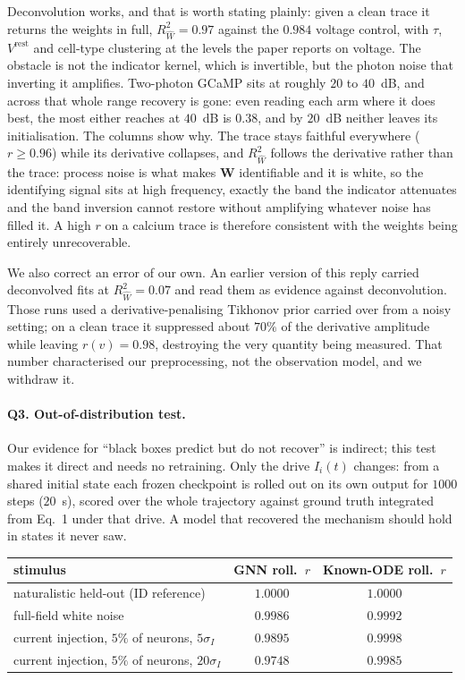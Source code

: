 \documentclass[11pt]{article}
\newcommand{\Rw}{R^2_{\widehat W}}
\newcommand{\Mat}[1]{\mathbf{#1}}
\begin{document}
Deconvolution works, and that is worth stating plainly: given a clean trace it
returns the weights in full, $\Rw = 0.97$ against the $0.984$ voltage control,
with $\tau$, $V^{\mathrm{rest}}$ and cell-type clustering at the levels the paper
reports on voltage. The obstacle is not the indicator kernel, which is
invertible, but the photon noise that inverting it amplifies. Two-photon GCaMP
sits at roughly $20$ to $40$~dB, and across that whole range recovery is gone:
even reading each arm where it does best, the most either reaches at
$40$~dB is $0.38$, and by $20$~dB neither leaves its initialisation. The
columns show why. The trace stays faithful everywhere ($r \geq 0.96$) while
its derivative collapses, and $\Rw$ follows the derivative rather than the trace:
process noise is what makes $\Mat{W}$ identifiable and it is white, so the
identifying signal sits at high frequency, exactly the band the indicator
attenuates and the band inversion cannot restore without amplifying whatever
noise has filled it. A high $r$ on a calcium trace is therefore consistent with
the weights being entirely unrecoverable.

We also correct an error of our own. An earlier version of this reply carried
deconvolved fits at $\Rw = 0.07$ and read them as evidence against
deconvolution. Those runs used a derivative-penalising Tikhonov prior carried
over from a noisy setting; on a clean trace it suppressed about $70\%$ of the
derivative amplitude while leaving $r(v) = 0.98$, destroying the very quantity
being measured. That number characterised our preprocessing, not the observation
model, and we withdraw it.

\paragraph{Q3. Out-of-distribution test.}
Our evidence for ``black boxes predict but do not recover'' is indirect; this
test makes it direct and needs no retraining. Only the drive $I_i(t)$ changes:
from a shared initial state each frozen checkpoint is rolled out on its own
output for $1000$ steps ($20$~s), scored over the whole trajectory against
ground truth integrated from Eq.~1 under that drive. A model that recovered the
mechanism should hold in states it never saw.
\label{link6}
\begin{center}
{\footnotesize
\begin{tabular}{lcc}
\toprule
stimulus & GNN roll.\ $r$ & Known-ODE roll.\ $r$ \\
\midrule
naturalistic held-out (ID reference) & $1.0000$ & $1.0000$ \\
full-field white noise               & $0.9986$ & $0.9992$ \\
current injection, $5\%$ of neurons, $5\sigma_I$  & $0.9895$ & $0.9998$ \\
current injection, $5\%$ of neurons, $20\sigma_I$ & $0.9748$ & $0.9985$ \\
\bottomrule
\end{tabular}}
\end{center}
\end{document}
